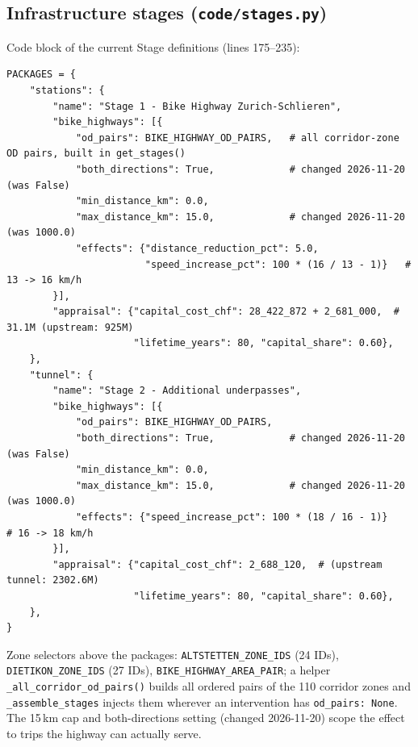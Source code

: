 \documentclass[10pt,a4paper]{article}
\begin{document}
\subsection{Infrastructure stages (\texttt{code/stages.py})}
Code block of the current Stage definitions (lines 175--235):
\begin{lstlisting}
PACKAGES = {
    "stations": {
        "name": "Stage 1 - Bike Highway Zurich-Schlieren",
        "bike_highways": [{
            "od_pairs": BIKE_HIGHWAY_OD_PAIRS,   # all corridor-zone OD pairs, built in get_stages()
            "both_directions": True,             # changed 2026-11-20 (was False)
            "min_distance_km": 0.0,
            "max_distance_km": 15.0,             # changed 2026-11-20 (was 1000.0)
            "effects": {"distance_reduction_pct": 5.0,
                        "speed_increase_pct": 100 * (16 / 13 - 1)}   # 13 -> 16 km/h
        }],
        "appraisal": {"capital_cost_chf": 28_422_872 + 2_681_000,  # 31.1M (upstream: 925M)
                      "lifetime_years": 80, "capital_share": 0.60},
    },
    "tunnel": {
        "name": "Stage 2 - Additional underpasses",
        "bike_highways": [{
            "od_pairs": BIKE_HIGHWAY_OD_PAIRS,
            "both_directions": True,             # changed 2026-11-20 (was False)
            "min_distance_km": 0.0,
            "max_distance_km": 15.0,             # changed 2026-11-20 (was 1000.0)
            "effects": {"speed_increase_pct": 100 * (18 / 16 - 1)}    # 16 -> 18 km/h
        }],
        "appraisal": {"capital_cost_chf": 2_688_120,  # (upstream tunnel: 2302.6M)
                      "lifetime_years": 80, "capital_share": 0.60},
    },
}
\end{lstlisting}
Zone selectors above the packages: \texttt{ALTSTETTEN\_ZONE\_IDS} (24 IDs),
\texttt{DIETIKON\_ZONE\_IDS} (27 IDs), \texttt{BIKE\_HIGHWAY\_AREA\_PAIR}; a helper
\texttt{\_all\_corridor\_od\_pairs()} builds all ordered pairs of the 110 corridor zones
and \texttt{\_assemble\_stages} injects them wherever an intervention has
\texttt{od\_pairs: None}. The 15\,km cap and both-directions setting (changed 2026-11-20)
scope the effect to trips the highway can actually serve.
\end{document}
